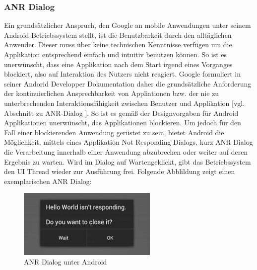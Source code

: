 \documentclass[12pt,oneside,a4paper,bibtotoc,liststotoc]{scrreprt}
\begin{document}
\subsubsection{ANR Dialog}
Ein grundsätzlicher Anspruch, den Google an mobile Anwendungen unter seinem Android Betriebssystem stellt, ist die Benutzbarkeit durch den alltäglichen Anwender. Dieser muss über keine technischen Kenntnisse verfügen um die Applikation entsprechend einfach und intuitiv benutzen können. So ist es unerwünscht, dass eine Applikation nach dem Start irgend eines Vorganges blockiert, also auf Interaktion des Nutzers nicht reagiert. Google formuliert in seiner Andorid Developper Dokumentation daher die grundsätzliche Anforderung der kontinuierlichen Ansprechbarkeit von Appliationen bzw. der nie zu unterbrechenden Interaktionsfähigkeit zwischen Benutzer und Applikation [vgl. Abschnitt zu ANR-Dialog \citet{androidDevDocu}]. So ist es gemäß der Designvorgaben für Android Applikationen unerwünscht, das Applikationen blockieren. Um jedoch für den Fall einer blockierenden Anwendung gerüstet zu sein, bietet Android die Möglichkeit, mittels eines Applikation Not Responding Dialogs, kurz ANR Dialog die Verarbeitung innerhalb einer Anwendung abzubrechen oder weiter auf deren Ergebnis zu warten. Wird im Dialog auf \glqq Warten\grqq geklickt, gibt das Betriebssystem den UI Thread wieder zur Ausführung frei. Folgende Abblildung zeigt einen exemplarischen ANR Dialog:
\begin{figure}[H]
  \begin{centering}
    \includegraphics[width=0.6\textwidth]{img/anr-dialog.png}
    \caption{ANR Dialog unter Android}
    \label{ANR Dialog}
  \end{centering}
\end{figure}
\end{document}
